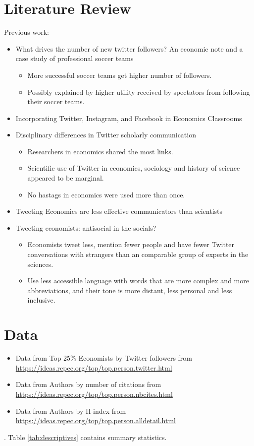 \documentclass[12pt,english]{article}
\begin{document}
\section{Literature Review}\label{sec:litreview}
Previous work:
\begin{itemize}
    \item What drives the number of new twitter followers? An economic note and a case study of professional soccer teams
        \begin{itemize}
            \item More successful soccer teams get higher number of followers.
            \item Possibly explained by higher utility received by spectators from following their soccer teams.
        \end{itemize}
    \item Incorporating Twitter, Instagram, and Facebook in Economics Classrooms
    \item Disciplinary differences in Twitter scholarly communication
        \begin{itemize}
            \item Researchers in economics shared the most links.
            \item Scientific use of Twitter in economics, sociology and history of science appeared to be marginal. 
            \item No hastags in economics were used more than once.
        \end{itemize}
    \item Tweeting Economics are less effective communicators than scientists
    \item Tweeting economists: antisocial in the socials?
        \begin{itemize}
            \item Economists tweet less, mention fewer people and have fewer Twitter conversations with strangers than an comparable group of experts in the sciences. 
            \item Use less accessible language with words that are more complex and more abbreviations, and their tone is more distant, less personal and less inclusive. 
        \end{itemize}
\end{itemize}

\section{Data}\label{sec:data}
\begin{itemize}
    \item Data from Top 25\% Economists by Twitter followers from \url{https://ideas.repec.org/top/top.person.twitter.html}
    \item Data from Authors by number of citations from \url{https://ideas.repec.org/top/top.person.nbcites.html}
    \item Data from Authors by H-index from \url{https://ideas.repec.org/top/top.person.alldetail.html}
\end{itemize}
. Table \ref{tab:descriptives} contains summary statistics.
\lipsum[1]
\end{document}
